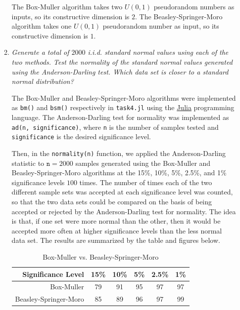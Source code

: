 \documentclass{article}
\begin{document}
\begin{enumerate}
\begin{enumerate}
                The Box-Muller algorithm takes two $U(0, 1)$ pseudorandom numbers as inputs, so its constructive dimension is $2$.
                The Beasley-Springer-Moro algorithm takes one $U(0, 1)$ pseudorandom number as input, so its constructive dimension is $1$.
            \item \label{4b}
                {\it Generate a total of $2000$ i.i.d. standard normal values using each of the two methods.
                Test the normality of the standard normal values generated using the Anderson-Darling test.
                Which data set is closer to a standard normal distribution?}

                The Box-Muller and Beasley-Springer-Moro algorithms were implemented as \texttt{bm()} and \texttt{bsm()} respectively in \texttt{task4.jl} using the
                \href{https://julialang.org}{Julia} programming language.
                The Anderson-Darling test for normality was implemented as \texttt{ad(n, significance)},
                where \texttt{n} is the number of samples tested and \texttt{significance} is the desired significance level.

                Then, in the \texttt{normality(n)} function, we applied the Anderson-Darling statistic to $\texttt{n} = 2000$
                samples generated using the Box-Muller and Beasley-Springer-Moro algorithms at the 15\%, 10\%, 5\%, 2.5\%, and 1\% significance levels $100$ times.
                The number of times each of the two different sample sets was accepted at each significance level was counted,
                so that the two data sets could be compared on the basis of being accepted or rejected by the Anderson-Darling test for normality.
                The idea is that, if one set were more normal than the other, then it would be accepted more often at higher significance levels than the less normal data set.
                The results are summarized by the table and figures below.

                \begin{table}[H]
                    \centering
                    \caption{Box-Muller vs. Beasley-Springer-Moro}
                    \begin{tabular}{|r|c|c|c|c|c|} \hline
                        Significance Level      & 15\% & 10\% & 5\% & 2.5\% & 1\%   \\ \hline
                        Box-Muller              & 79   & 91   & 95  & 97    & 97    \\ \hline
                        Beasley-Springer-Moro   & 85   & 89   & 96  & 97    & 99    \\ \hline
                    \end{tabular}
                    \label{tab:normality}
                \end{table}


\end{enumerate}
\end{enumerate}
\end{document}
